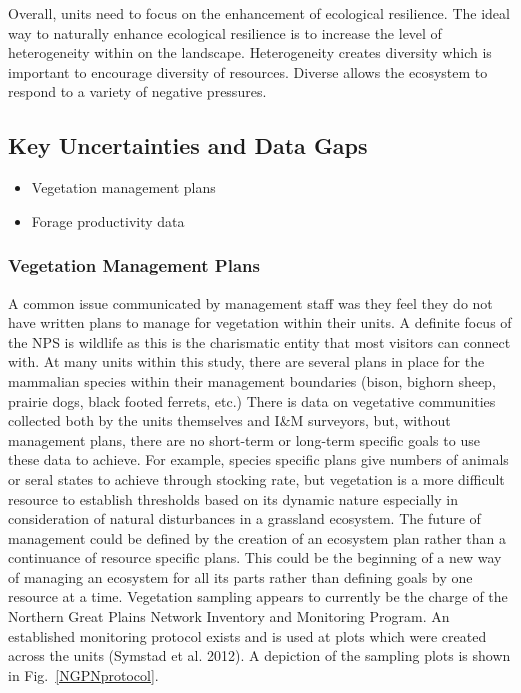 Overall, units need to focus on the enhancement of ecological resilience. 
The ideal way to naturally enhance ecological resilience is to increase the level of heterogeneity within on the landscape.
Heterogeneity creates diversity which is important to encourage diversity of resources. 
Diverse allows the ecosystem to respond to a variety of negative pressures.

\hypertarget{key-uncertainties-and-data-gaps}{%
	\subsection{Key Uncertainties and Data
		Gaps}\label{key-uncertainties-and-data-gaps}}

\begin{itemize}
	\item Vegetation management plans
	\item Forage productivity data
\end{itemize}

\hypertarget{vegetation-management-plans}{%
	\subsubsection{Vegetation Management
		Plans}\label{vegetation-management-plans}}

A common issue communicated by management staff was they feel they do not have written plans to manage for vegetation within their units. 
A definite focus of the NPS is wildlife as this is the charismatic entity that most visitors can connect with. 
At many units within this study, there are several plans in place for the mammalian species within their
management boundaries (bison, bighorn sheep, prairie dogs, black footed ferrets, etc.) 
There is data on vegetative communities collected both by the units themselves and I\&M surveyors, but, without management plans, there are no short-term or long-term specific goals to use these data to achieve. 
For example, species specific plans give numbers of animals or seral states to achieve through stocking rate, but vegetation is a more difficult resource to establish thresholds based on its dynamic nature especially in consideration of natural disturbances in a grassland ecosystem. 
The future of management could be defined by the creation of an ecosystem plan rather than a continuance of resource specific plans.
This could be the beginning of a new way of managing an ecosystem for all its parts rather than defining goals by one resource at a time.
Vegetation sampling appears to currently be the charge of the Northern Great Plains Network Inventory and Monitoring Program. 
An established monitoring protocol exists and is used at plots which were created across the units (Symstad et al. 2012). 
A depiction of the sampling plots is shown in Fig.~\ref{NGPNprotocol}.

